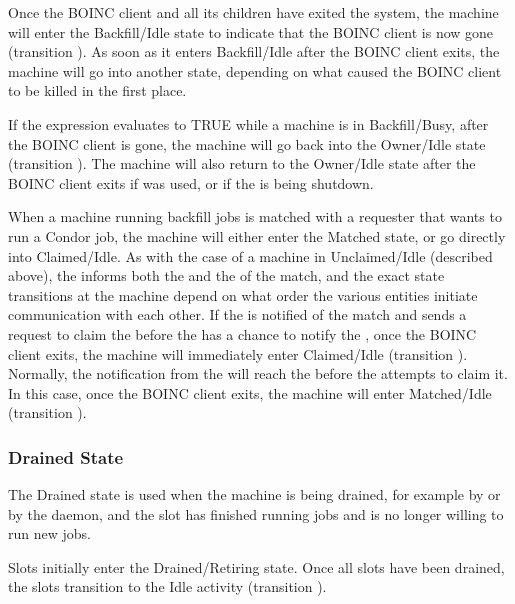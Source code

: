 Once the BOINC client and all its children have exited the system, the
machine will enter the Backfill/Idle state to indicate that the BOINC
client is now gone (transition ).
As soon as it enters Backfill/Idle after the BOINC client exits, the
machine will go into another state, depending on what caused the BOINC
client to be killed in the first place.

If the  expression evaluates to TRUE while a
machine is in Backfill/Busy, after the BOINC client is gone, the
machine will go back into the Owner/Idle state (transition
).
The machine will also return to the Owner/Idle state after the BOINC
client exits if  was used, or if the  is
being shutdown.

When a machine running backfill jobs is matched with a requester that
wants to run a Condor job, the machine will either enter the Matched
state, or go directly into Claimed/Idle.
As with the case of a machine in Unclaimed/Idle (described above), the
 informs both the  and the
 of the match, and the exact state transitions at the
machine depend on what order the various entities initiate
communication with each other.
If the  is notified of the match and sends a request to
claim the  before the  has a chance
to notify the , once the BOINC client exits, the
machine will immediately enter Claimed/Idle (transition ).
Normally, the notification from the  will reach the
 before the  attempts to claim it.
In this case, once the BOINC client exits, the machine will enter
Matched/Idle (transition ).

\subsubsection{\label{sec:Drained-State}Drained State}

The Drained state is used when the machine is being drained,
for example by  or by the  daemon,
and the slot has finished running
jobs and is no longer willing to run new jobs.

Slots initially enter the Drained/Retiring state.  Once all slots have
been drained, the slots transition to the Idle activity (transition
).

